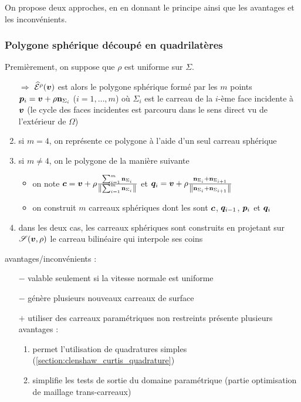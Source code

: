 On propose deux approches, en en donnant le principe ainsi que les avantages et les inconvénients.

\subsubsection{Polygone sphérique découpé en quadrilatères}
\label{section:quadrangulation_polygone_spherique}
Premièrement, on suppose que $\rho$ est uniforme sur $\Sigma$. 

\begin{enumerate}
	\item[$\Rightarrow$] $\widehat{\mathcal{E}}^{\rho}({\bm{v}})$ est alors le polygone sphérique formé par les $m$ points $\bm{p}_i = \bm{v} + \rho \mathbf{n}_{\Sigma_i}$ ($i = 1, \ldots, m$)	où $\Sigma_i$ est le carreau de la $i$-ème face incidente à $\bm{v}$ (le cycle des faces incidentes est parcouru dans le sens direct vu de l'extérieur de $\Omega$)
	\item si $m = 4$, on représente ce polygone à l'aide d'un seul carreau sphérique
	\item si $m \neq 4$, on  le polygone de la manière suivante 
	\begin{itemize}
		\item on note $\bm{c} = \bm{v} + \rho \frac{\sum_{i=1}^m \mathbf{n}_{\Sigma_i}}{\left\| {\sum_{i=1}^m \mathbf{n}_{\Sigma_i}} \right\|}$ et $\bm{q}_i = \bm{v} + \rho \frac{\mathbf{n}_{\Sigma_i} + \mathbf{n}_{\Sigma_{i+1}}}{\left\| {\mathbf{n}_{\Sigma_i} + \mathbf{n}_{\Sigma_{i+1}}} \right\|}$
		\item on construit $m$ carreaux sphériques dont les  sont $\bm{c}$, $\bm{q}_{i-1}$, $\bm{p}_i$ et $\bm{q}_i$
	\end{itemize}
	\item dans les deux cas, les carreaux sphériques sont construits en projetant sur $\sphere[\v][\rho]$ le carreau bilinéaire qui interpole ses coins
\end{enumerate}


avantages/inconvénients :
\begin{itemize}
	\item[$-$] valable seulement si la vitesse normale est uniforme
	\item[$-$] génère plusieurs nouveaux carreaux de surface
	\item[$+$] utiliser des carreaux paramétriques non restreints présente plusieurs avantages :
	\begin{enumerate}
		\item permet l'utilisation de quadratures simples (\cf \autoref{section:clenshaw_curtis_quadrature})
		\item simplifie les tests de sortie du domaine paramétrique (\cf partie optimisation de maillage trans-carreaux)
	\end{enumerate}
\end{itemize}


